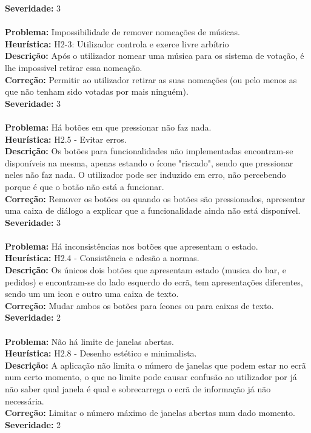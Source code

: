 \documentclass{article}
\begin{document}
\textbf{Severidade:} 3\\
\\
\textbf{Problema:} Impossibilidade de remover nomeações de músicas.\\
\textbf{Heurística:} H2-3: Utilizador controla e exerce livre arbítrio\\
\textbf{Descrição:} Após o utilizador nomear uma música para os sistema de votação, é lhe impossivel retirar essa nomeação.\\
\textbf{Correção:} Permitir ao utilizador retirar as suas nomeações (ou pelo menos as que não tenham sido votadas por mais ninguém).\\
\textbf{Severidade:} 3\\
\\
\textbf{Problema:} Há botões em que pressionar não faz nada.\\
\textbf{Heurística:} H2.5 - Evitar erros.\\
\textbf{Descrição:} Os botões para funcionalidades não implementadas encontram-se disponíveis na mesma, apenas estando o ícone "riscado", sendo que pressionar neles não faz nada. O utilizador pode ser induzido em erro, não percebendo porque é que o botão não está a funcionar.\\
\textbf{Correção:} Remover os botões ou quando os botões são pressionados, apresentar uma caixa de diálogo a explicar que a funcionalidade ainda não está disponível.\\
\textbf{Severidade:} 3\\
\\
\textbf{Problema:} Há inconsistências nos botões que apresentam o estado.\\
\textbf{Heurística:} H2.4 - Consistência e adesão a normas.\\
\textbf{Descrição:} Os únicos dois botões que apresentam estado (musica do bar, e pedidos) e encontram-se do lado esquerdo do ecrã, tem apresentações diferentes, sendo um um icon e outro uma caixa de texto.\\
\textbf{Correção:} Mudar ambos os botões para ícones ou para caixas de texto.\\
\textbf{Severidade:} 2\\
\\
\textbf{Problema:} Não há limite de janelas abertas.\\
\textbf{Heurística:} H2.8 - Desenho	estético	 e minimalista.\\
\textbf{Descrição:} A aplicação não limita o número de janelas que podem estar no ecrã num certo momento, o que no limite pode causar confusão ao utilizador por já não saber qual janela é qual e sobrecarrega o ecrã de informação já não necessária.\\
\textbf{Correção:} Limitar o número máximo de janelas abertas num dado momento.\\
\textbf{Severidade:} 2\\
\\
\end{document}
